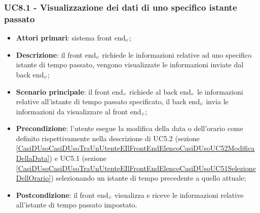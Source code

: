 \subsubsection{UC8.1 - Visualizzazione dei dati di uno specifico istante passato}\label{CasiDUsoCasiDUsoTraIlFrontEndEIlBackEndElencoDeiCasiDUsoUC81VisualizzazioneDeiDatiDiUnoSpecificoIstante}
\begin{itemize}
	\item \textbf{Attori primari}: sistema front end$_{\scaleto{G}{3pt}}$;
	\item \textbf{Descrizione}: il front end$_{\scaleto{G}{3pt}}$ richiede le informazioni relative ad uno specifico istante di tempo passato, vengono visualizzate le informazioni inviate dal back end$_{\scaleto{G}{3pt}}$;
	\item \textbf{Scenario principale}:  il front end$_{\scaleto{G}{3pt}}$ richiede al back end$_{\scaleto{G}{3pt}}$ le informazioni relative all'istante di tempo passato specificato, il back end$_{\scaleto{G}{3pt}}$ invia le informazioni da visualizzare al front end$_{\scaleto{G}{3pt}}$;
	\item \textbf{Precondizione}: l’utente esegue la modifica della data o dell’orario come definito rispettivamente nella descrizione di UC5.2 (sezione \ref{CasiDUsoCasiDUsoTraUnUtenteEIlFrontEndElencoCasiDUsoUC52ModificaDellaData}) e UC5.1 (sezione \ref{CasiDUsoCasiDUsoTraUnUtenteEIlFrontEndElencoCasiDUsoUC51SelezioneDellOrario}) selezionando un istante di tempo precedente a quello attuale;
	\item \textbf{Postcondizione}: il front end$_{\scaleto{G}{3pt}}$ visualizza e riceve le informazioni relative all'istante di tempo passato impostato.
\end{itemize}

